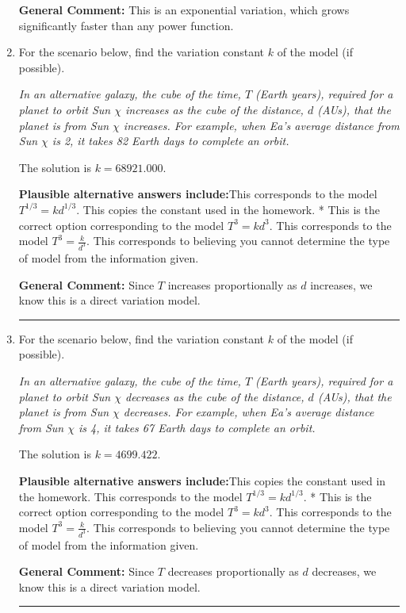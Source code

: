 \documentclass{extbook}[14pt]
\newcommand{\litem}[1]{\item #1

\rule{\textwidth}{0.4pt}}
\begin{document}
\begin{enumerate}
{\begin{enumerate}[label=\Alph*.]
\end{enumerate}

\textbf{General Comment:} This is an exponential variation, which grows significantly faster than any power function.
}
\litem{
For the scenario below, find the variation constant $k$ of the model (if possible).

\begin{center}
    \textit{ In an alternative galaxy, the cube of the time, $T$ (Earth years), required for a planet to orbit Sun $\chi$ increases as the cube of the distance, $d$ (AUs), that the planet is from Sun $\chi$ increases. For example, when Ea's average distance from Sun $\chi$ is 2, it takes 82 Earth days to complete an orbit. }
\end{center}
The solution is \( k = 68921.000 \).\begin{enumerate}[label=\Alph*.]
\textbf{Plausible alternative answers include:}This corresponds to the model $T^{1/3} = k d^{1/3}$.
This copies the constant used in the homework.
* This is the correct option corresponding to the model $T^{3} = k d^{3}$.
This corresponds to the model $T^{3} = \frac{k}{d^{3}}$.
This corresponds to believing you cannot determine the type of model from the information given.
\end{enumerate}

\textbf{General Comment:} Since $T$ increases proportionally as $d$ increases, we know this is a direct variation model.
}
\litem{
For the scenario below, find the variation constant $k$ of the model (if possible).

\begin{center}
    \textit{ In an alternative galaxy, the cube of the time, $T$ (Earth years), required for a planet to orbit Sun $\chi$ decreases as the cube of the distance, $d$ (AUs), that the planet is from Sun $\chi$ decreases. For example, when Ea's average distance from Sun $\chi$ is 4, it takes 67 Earth days to complete an orbit. }
\end{center}
The solution is \( k = 4699.422 \).\begin{enumerate}[label=\Alph*.]
\textbf{Plausible alternative answers include:}This copies the constant used in the homework.
This corresponds to the model $T^{1/3} = k d^{1/3}$.
* This is the correct option corresponding to the model $T^{3} = k d^{3}$.
This corresponds to the model $T^{3} = \frac{k}{d^{3}}$.
This corresponds to believing you cannot determine the type of model from the information given.
\end{enumerate}

\textbf{General Comment:} Since $T$ decreases proportionally as $d$ decreases, we know this is a direct variation model.
}
\end{enumerate}
\end{document}
